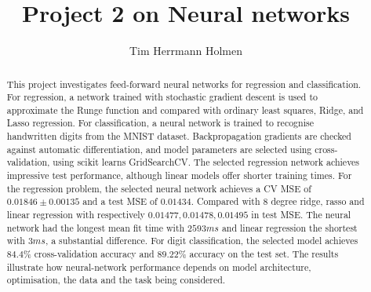 \documentclass[aps,rmp,reprint,raggedbottom,amsmath,amssymb,longbibliography,floatfix]{revtex4-1}
\providecommand{\frontmatter}{\clearpage\pagenumbering{roman}}
\providecommand{\mainmatter}{\clearpage\pagenumbering{arabic}}
\begin{document}
\frontmatter

\title{Project 2 on Neural networks}

\author{Tim Herrmann Holmen}

\begin{abstract}
This project investigates feed-forward neural networks for regression 
and classification. For regression, a network trained with stochastic
gradient descent is used to approximate the Runge function and compared 
with ordinary least squares, Ridge, and Lasso regression. 
For classification, a neural network is trained to recognise 
handwritten digits from the MNIST dataset. 
Backpropagation gradients are checked against automatic differentiation, 
and model parameters are selected using cross-validation, using
scikit learns GridSearchCV. 
The selected regression network achieves impressive test performance, 
although linear models offer shorter training times. 
For the regression problem, the selected neural network achieves
a CV MSE of $0.01846 \pm 0.00135$ and a test MSE of $0.01434$. Compared
with 8 degree ridge, rasso and linear regression with respectively $0.01477, 0.01478, 0.01495$ in test MSE.
The neural network had the longest mean fit time with $2593 ms$ and linear regression the shortest with $3 ms$, a substantial difference.
For digit classification, the selected model achieves 
$84.4\%$ cross-validation accuracy and $89.22\%$ 
accuracy on the test set. 
The results illustrate how neural-network performance 
depends on model architecture, optimisation, the data and the task being considered.
\end{abstract}

\maketitle
\clearpage

\mainmatter









 
\end{document}
